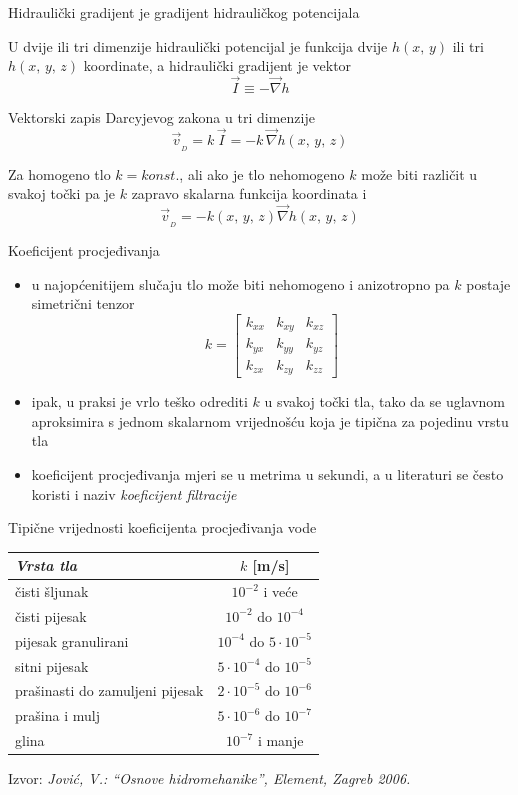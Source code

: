 \documentclass{beamer}
\begin{document}
%
\begin{frame}{Hidraulički gradijent je gradijent hidrauličkog potencijala}
\begin{block}{}
U dvije ili tri dimenzije hidraulički potencijal je funkcija dvije
$h(x,\,y)$ ili tri $h(x,\,y,\,z)$ koordinate, a hidraulički gradijent
je vektor 
\[
\vec{I}\equiv-\vec{\nabla}h
\]
\end{block}
\begin{alertblock}{Vektorski zapis Darcyjevog zakona u tri dimenzije}
\[
\vec{v}_{_{D}}=k\,\vec{I}=-k\,\vec{\nabla}h(x,\,y,\,z)
\]
\end{alertblock}
Za homogeno tlo $k=konst.$, ali ako je tlo nehomogeno $k$ može biti
različit u svakoj točki pa je $k$ zapravo skalarna funkcija koordinata
i 
\[
\vec{v}_{_{D}}=-k(x,\,y,\,z)\vec{\nabla}h(x,\,y,\,z)
\]
\end{frame}
%
\begin{frame}{Koeficijent procjeđivanja}
\begin{itemize}
\item u najopćenitijem slučaju tlo može biti nehomogeno i anizotropno pa
$k$ postaje simetrični tenzor 
\[
k=\left[\begin{array}{ccc}
k_{xx} & k_{xy} & k_{xz}\\
k_{yx} & k_{yy} & k_{yz}\\
k_{zx} & k_{zy} & k_{zz}
\end{array}\right]
\]
\item ipak, u praksi je vrlo teško odrediti $k$ u svakoj točki tla, tako
da se uglavnom aproksimira s jednom skalarnom vrijednošću koja je
tipična za pojedinu vrstu tla 
\item koeficijent procjeđivanja mjeri se u metrima u sekundi, a u literaturi
se često koristi i naziv \emph{koeficijent filtracije} 
\end{itemize}
\end{frame}
%
\begin{frame}{Tipične vrijednosti koeficijenta procjeđivanja vode}
\begin{center}
\begin{tabular}{|l|c|}
\hline 
\emph{Vrsta tla}  & $k$ {[}m/s{]}\tabularnewline
\hline 
\hline 
čisti šljunak  & $10^{-2}$ i veće\tabularnewline
\hline 
čisti pijesak  & $10^{-2}$ do $10^{-4}$\tabularnewline
\hline 
pijesak granulirani  & $10^{-4}$ do $5\cdot10^{-5}$\tabularnewline
\hline 
sitni pijesak  & $5\cdot10^{-4}$ do $10^{-5}$\tabularnewline
\hline 
prašinasti do zamuljeni pijesak  & $2\cdot10^{-5}$ do $10^{-6}$\tabularnewline
\hline 
prašina i mulj  & $5\cdot10^{-6}$ do $10^{-7}$\tabularnewline
\hline 
glina  & $10^{-7}$ i manje \tabularnewline
\hline 
\end{tabular}
\par\end{center}
\vfill{}
 Izvor: \emph{Jović, V.: ``Osnove hidromehanike'', Element, Zagreb
2006.} 
\end{frame}
\end{document}
